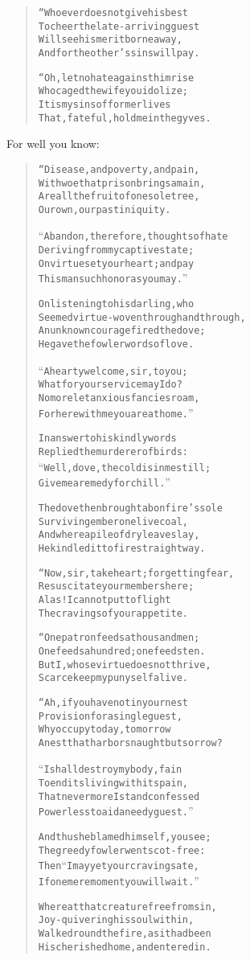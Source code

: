 \documentclass[article, twoside, 14pt]{memoir}
\renewenvironment{verbatim}{%
\begin{quote}%
\vskip -10pt%
\begin{alltt}\normalfont\large}{\end{alltt}%
\end{quote}%
\vskip -10pt
} %
\begin{document}
\begin{verbatim}
“Whoever does not give his best
To cheer the late-arriving guest
Will see his merit borne away,
And for the other's sins will pay.

“Oh, let no hate against him rise
Who caged the wife you idolize;
It is my sins of former lives
That, fateful, hold me in the gyves.
\end{verbatim}
For well you know:

\begin{verbatim}
“Disease, and poverty, and pain,
With woe that prison brings amain,
Are all the fruit of one sole tree,
Our own, our past iniquity.

“Abandon, therefore, thoughts of hate
Deriving from my captive state;
On virtue set your heart; and pay
This man such honor as you may.”

On listening to his darling, who
Seemed virtue-woven through and through,
An unknown courage fired the dove;
He gave the fowler words of love.

“A hearty welcome, sir, to you;
What for your service may I do?
No more let anxious fancies roam,
For here with me you are at home.”

In answer to his kindly words
Replied the murderer of birds:
“Well, dove, the cold is in me still;
Give me a remedy for chill.”

The dove then brought a bonfire's sole
Surviving ember{\textemdash}one live coal,
And where a pile of dry leaves lay,
He kindled it to fire straightway.

“Now, sir, take heart; forgetting fear,
Resuscitate your members here;
Alas! I cannot put to flight
The cravings of your appetite.

“One patron feeds a thousand men;
One feeds a hundred; one feeds ten.
But I, whose virtue does not thrive,
Scarce keep my puny self alive.

“Ah, if you have not in your nest
Provision for a single guest,
Why occupy today, tomorrow
A nest that harbors naught but sorrow?

“I shall destroy my body, fain
To end its living with its pain,
That nevermore I stand confessed
Powerless to aid a needy guest.”

And thus he blamed himself, you see;
The greedy fowler went scot-free:
Then{\textemdash}“I may yet your craving sate,
If one mere moment you will wait.”

Whereat that creature free from sin,
Joy-quivering his soul within,
Walked round the fire, as it had been
His cherished home, and entered in.


\end{verbatim}
\end{document}
